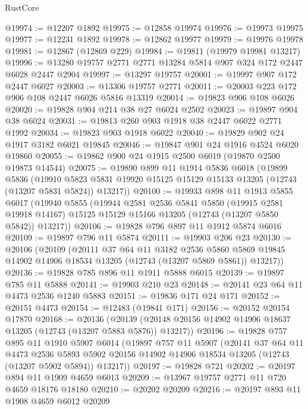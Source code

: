 \begin{lexlean}{RustCore}
\begin{coremodule}
@19974 := @12207 @1892
@19975 := @12858 @19974
@19976 := @19973 @19975
@19977 := @12231 @1892
@19978 := @12862 @19977
@19979 := @19976 @19978
@19981 := @12867 (@12869 @229)
@19984 := @19811 (@19979 @19981 @13217)
@19996 := @13280 @19757 @2771 @2771 @13284 @5814 @907 @324 @172 @2447 @6028 @2447 @2904
@19997 := @13297 @19757
@20001 := @19997 @907 @172 @2447 @6027
@20003 := @13306 @19757 @2771
@20011 := @20003 @223 @172 @906 @108 @2447 @6026 @5816 @13319
@20014 := @19823 @906 @108 @6026
@20020 := @19828 @904 @214 @38 @27 @6024 @2502
@20023 := @19897 @904 @38 @6024
@20031 := @19813 @260 @903 @1918 @38 @2447 @6022 @2771 @1992
@20034 := @19823 @903 @1918 @6022
@20040 := @19829 @902 @24 @1917 @3182 @6021 @19845
@20046 := @19847 @901 @24 @1916 @4524 @6020 @19860
@20055 := @19862 @900 @24 @1915 @2500 @6019 (@19870 @2500 @19873 @14544)
@20075 := @19890
    @899
    @11
    @1914
    @5836
    @6018
    (@19899
      @5836
      (@19910 @5823 @5831 @19920 @15125 @15129 @15133 @13205 (@12743 (@13207 @5831 @5824)) @13217))
@20100 := @19933
    @898
    @11
    @1913
    @5855
    @6017
    (@19940
      @5855
      (@19944
        @2581
        @2536
        @5841
        @5850
        (@19915 @2581 @19918 @14167)
        @15125
        @15129
        @15166
        @13205
        (@12743 (@13207 @5850 @5842))
        @13217))
@20106 := @19828 @796 @897 @11 @1912 @5874 @6016
@20109 := @19897 @796 @11 @5874
@20111 := @19903 @206 @23
@20130 := @20106
    (@20109
      (@20111
        @37
        @64
        @11
        @3182
        @2536
        @5860
        @5869
        @19845
        @14902
        @14906
        @18534
        @13205
        (@12743 (@13207 @5869 @5861))
        @13217))
@20136 := @19828 @785 @896 @11 @1911 @5888 @6015
@20139 := @19897 @785 @11 @5888
@20141 := @19903 @210 @23
@20148 := @20141 @23 @64 @11 @4473 @2536 @1240 @5883
@20151 := @19836 @171 @24 @171
@20152 := @20151 @4473
@20154 := @12483 (@19841 @171)
@20156 := @20152 @20154 @17870
@20168 := @20136
    (@20139 (@20148 @20156 @14902 @14906 @18637 @13205 (@12743 (@13207 @5883 @5876)) @13217))
@20196 := @19828
    @757
    @895
    @11
    @1910
    @5907
    @6014
    (@19897
      @757
      @11
      @5907
      (@20141
        @37
        @64
        @11
        @4473
        @2536
        @5893
        @5902
        @20156
        @14902
        @14906
        @18534
        @13205
        (@12743 (@13207 @5902 @5894))
        @13217))
@20197 := @19828 @721
@20202 := @20197 @894 @11 @1909 @4659 @6013
@20209 := @13967 @19757 @2771 @11 @720 @4659 @18176 @18180
@20210 := @20202 @20209
@20216 := @20197 @893 @11 @1908 @4659 @6012 @20209

\end{coremodule}
\end{lexlean}
